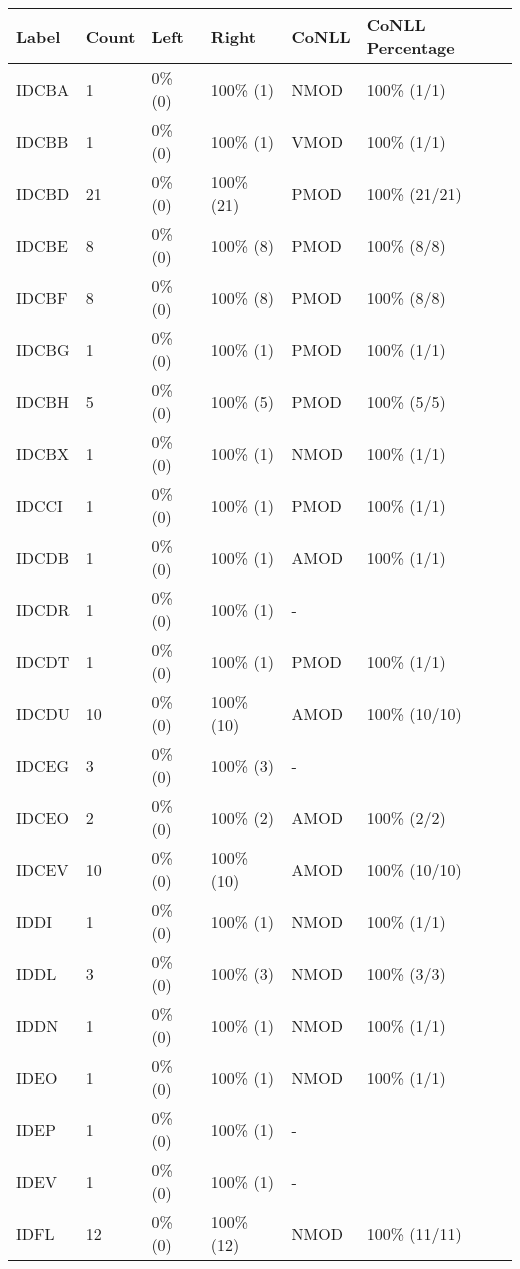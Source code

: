 \begin{figure*}
\begin{tabular}{|l|l|l|l||l|l|}
\hline
Label & Count & Left & Right & CoNLL & CoNLL Percentage\\ 
\hline
 IDCBA & 1 & 0\% (0) & 100\% (1) & NMOD & 100\% (1/1) \\ 
\hline
 IDCBB & 1 & 0\% (0) & 100\% (1) & VMOD & 100\% (1/1) \\ 
\hline
 IDCBD & 21 & 0\% (0) & 100\% (21) & PMOD & 100\% (21/21) \\ 
\hline
 IDCBE & 8 & 0\% (0) & 100\% (8) & PMOD & 100\% (8/8) \\ 
\hline
 IDCBF & 8 & 0\% (0) & 100\% (8) & PMOD & 100\% (8/8) \\ 
\hline
 IDCBG & 1 & 0\% (0) & 100\% (1) & PMOD & 100\% (1/1) \\ 
\hline
 IDCBH & 5 & 0\% (0) & 100\% (5) & PMOD & 100\% (5/5) \\ 
\hline
 IDCBX & 1 & 0\% (0) & 100\% (1) & NMOD & 100\% (1/1) \\ 
\hline
 IDCCI & 1 & 0\% (0) & 100\% (1) & PMOD & 100\% (1/1) \\ 
\hline
 IDCDB & 1 & 0\% (0) & 100\% (1) & AMOD & 100\% (1/1) \\ 
\hline
 IDCDR & 1 & 0\% (0) & 100\% (1) & - &  \\ 
\hline
 IDCDT & 1 & 0\% (0) & 100\% (1) & PMOD & 100\% (1/1) \\ 
\hline
 IDCDU & 10 & 0\% (0) & 100\% (10) & AMOD & 100\% (10/10) \\ 
\hline
 IDCEG & 3 & 0\% (0) & 100\% (3) & - &  \\ 
\hline
 IDCEO & 2 & 0\% (0) & 100\% (2) & AMOD & 100\% (2/2) \\ 
\hline
 IDCEV & 10 & 0\% (0) & 100\% (10) & AMOD & 100\% (10/10) \\ 
\hline
 IDDI & 1 & 0\% (0) & 100\% (1) & NMOD & 100\% (1/1) \\ 
\hline
 IDDL & 3 & 0\% (0) & 100\% (3) & NMOD & 100\% (3/3) \\ 
\hline
 IDDN & 1 & 0\% (0) & 100\% (1) & NMOD & 100\% (1/1) \\ 
\hline
 IDEO & 1 & 0\% (0) & 100\% (1) & NMOD & 100\% (1/1) \\ 
\hline
 IDEP & 1 & 0\% (0) & 100\% (1) & - &  \\ 
\hline
 IDEV & 1 & 0\% (0) & 100\% (1) & - &  \\ 
\hline
 IDFL & 12 & 0\% (0) & 100\% (12) & NMOD & 100\% (11/11) \\ 

\end{tabular}
\end{figure*}
